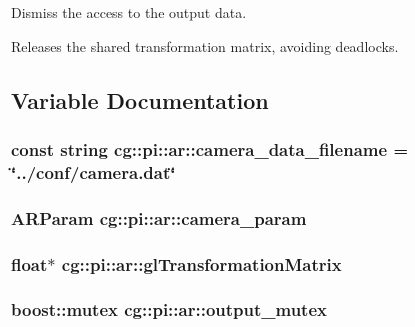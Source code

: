 \-Dismiss the access to the output data. 

\-Releases the shared transformation matrix, avoiding deadlocks. 

\subsection{\-Variable \-Documentation}
\hypertarget{namespacecg_1_1pi_1_1ar_ada61113604afb0827c60d1ce05d7bc14}{
\subsubsection[{camera\-\_\-data\-\_\-filename}]{\setlength{\rightskip}{0pt plus 5cm}const string {\bf cg\-::pi\-::ar\-::camera\-\_\-data\-\_\-filename} = \char`\"{}../conf/camera.\-dat\char`\"{}}}\label{namespacecg_1_1pi_1_1ar_ada61113604afb0827c60d1ce05d7bc14}
\hypertarget{namespacecg_1_1pi_1_1ar_ab8aaea8a88d522dba301bbda1b2e83e8}{
\subsubsection[{camera\-\_\-param}]{\setlength{\rightskip}{0pt plus 5cm}\-A\-R\-Param {\bf cg\-::pi\-::ar\-::camera\-\_\-param}}}\label{namespacecg_1_1pi_1_1ar_ab8aaea8a88d522dba301bbda1b2e83e8}
\hypertarget{namespacecg_1_1pi_1_1ar_a3d6b78e9280aef07edbb62c471582713}{
\subsubsection[{gl\-Transformation\-Matrix}]{\setlength{\rightskip}{0pt plus 5cm}float$\ast$ {\bf cg\-::pi\-::ar\-::gl\-Transformation\-Matrix}}}\label{namespacecg_1_1pi_1_1ar_a3d6b78e9280aef07edbb62c471582713}
\hypertarget{namespacecg_1_1pi_1_1ar_af9c0ea4eefb7149284522e73acd06221}{
\subsubsection[{output\-\_\-mutex}]{\setlength{\rightskip}{0pt plus 5cm}boost\-::mutex {\bf cg\-::pi\-::ar\-::output\-\_\-mutex}}}\label{namespacecg_1_1pi_1_1ar_af9c0ea4eefb7149284522e73acd06221}

